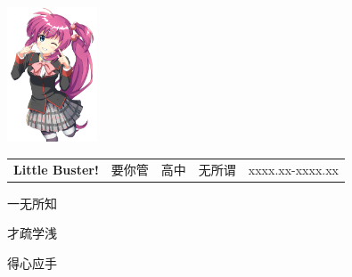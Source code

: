 \documentclass{cv}
\begin{document}
   \addPageColorBars


      \begin{minipage}[t]{0.55\textwidth}
           \\
         \vfill
            \\
         \vfill
              \\
         \vfill
         \\
         \vfill
              \\
         \vfill
         \vfill
   \end{minipage}
   \hfill
   \begin{adjustbox}{valign=t, max height=0.2\textheight}
      \includegraphics[width=0.2\textwidth]{avatar.png} 
   \end{adjustbox}
   \vspace{5pt}


   \vspace{5pt}
   \begin{tabularx}{\textwidth}{XXXXX}
      \textbf{Little Buster!} & 要你管& 高中 & 无所谓 & xxxx.xx-xxxx.xx\\
   \end{tabularx}
   \vspace{5pt}

\noindent
\begin{description}[topsep=5pt,leftmargin=0pt,itemsep=0.8pt ]
    \item[Music：] 一无所知
    \item[烹饪：] 才疏学浅
    \item[搞事情：]得心应手
\end{description}
\vspace{5pt}
\end{document}

